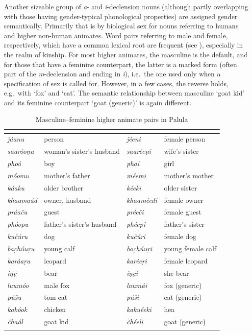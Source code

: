 \documentclass[output=collectionpaper]{langsci/langscibook}
\begin{document}
Another sizeable group of \textit{a}{}- and \textit{i}{}-declension nouns (although partly overlapping with those having gender-typical phonological properties) are assigned gender semantically. Primarily that is by biological sex for nouns referring to humans and higher non-human animates. Word pairs referring to male and female, respectively, which have a common lexical root are frequent (see ), especially in the realm of kinship. For most higher animates, the masculine is the default, and for those that have a feminine counterpart, the latter is a marked form (often part of the \textit{m}{}-declension and ending in \textit{i}), i.e.\ the one used only when a specification of sex is called for. However, in a few cases, the reverse holds, e.g.\ with `fox' and `cat'. The semantic relationship between masculine `goat kid' and its feminine counterpart `goat (generic)' is again different.

\begin{table}[htb]
\begin{tabularx}{\textwidth}{>{\itshape}l>{\raggedright\let\newline\\\arraybackslash\hspace{0pt}}X>{\itshape}l>{\raggedright\let\newline\\\arraybackslash\hspace{0pt}}X}
\lsptoprule
\multicolumn{2}{X}{\normalfont Masculine} & \multicolumn{2}{X}{\normalfont Feminine}\\
\midrule
ǰáanu & person & ǰéeni & female person\\
saaróoṇu & woman's sister's husband & saaréeṇi & wife's sister\\
phoó & boy & phaí & girl\\
móomu & mother's father & méemi & mother's mother\\
káaku & older brother & kéeki & older sister\\
khaamaád & owner, husband & khaaméedi & female owner\\
práaču & guest & préeči & female guest\\
phóopu & father's sister's husband & phéepi & father's sister\\
kučúru & dog & kučúri & female dog\\
bac̣húuṛu & young calf & bac̣húuṛi & young female calf\\
karáaṛu & leopard & karéeṛi & female leopard\\
iṇc̣ & bear & íṇc̣i & she-bear\\
luumóo & male fox & luumái & fox (generic)\\
púšu & tom-cat & púši & cat (generic)\\
kakóok & chicken & kakuéeki & hen\\
čhaál & goat kid & čhéeli & goat (generic)\\
\lspbottomrule
\end{tabularx}
\caption{Masculine--feminine higher animate pairs in Palula}
\label{tab:Lilje:9}
\end{table}
\end{document}
